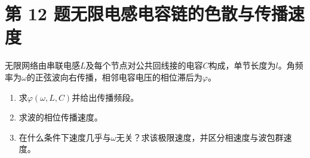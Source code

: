 \documentclass[UTF8,fontset=fandol,a4paper,11pt]{ctexart}
\begin{document}


\section*{第 12 题\quad 无限电感电容链的色散与传播速度}\label{q:12}


无限网络由串联电感$L$及每个节点对公共回线接的电容$C$构成，单节长度为$l$。角频率为$\omega$的正弦波向右传播，相邻电容电压的相位滞后为$\varphi$。
\begin{enumerate}
\item 求$\varphi(\omega,L,C)$并给出传播频段。
\item 求波的相位传播速度。
\item 在什么条件下速度几乎与$\omega$无关？求该极限速度，并区分相速度与波包群速度。
\end{enumerate}
\end{document}
